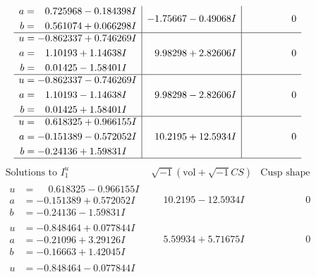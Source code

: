 \documentclass[1p]{elsarticle_modified}
\theoremstyle{definition}
\newcommand{\I}{\sqrt{-1}}
\begin{document}
$$\begin{array}{c|c|c}
\begin{aligned}
a &= \phantom{-}0.725968 - 0.184398 I \\
b &= \phantom{-}0.561074 + 0.066298 I\end{aligned}
 & -1.75667 - 0.49068 I & \phantom{-0.000000 } 0 \\ \hline\begin{aligned}
u &= -0.862337 + 0.746269 I \\
a &= \phantom{-}1.10193 + 1.14638 I \\
b &= \phantom{-}0.01425 - 1.58401 I\end{aligned}
 & \phantom{-}9.98298 + 2.82606 I & \phantom{-0.000000 } 0 \\ \hline\begin{aligned}
u &= -0.862337 - 0.746269 I \\
a &= \phantom{-}1.10193 - 1.14638 I \\
b &= \phantom{-}0.01425 + 1.58401 I\end{aligned}
 & \phantom{-}9.98298 - 2.82606 I & \phantom{-0.000000 } 0 \\ \hline\begin{aligned}
u &= \phantom{-}0.618325 + 0.966155 I \\
a &= -0.151389 - 0.572052 I \\
b &= -0.24136 + 1.59831 I\end{aligned}
 & \phantom{-}10.2195 + 12.5934 I & \phantom{-0.000000 } 0\\
 \hline 
 \end{array}$$\newpage$$\begin{array}{c|c|c}  
\text{Solutions to }I^u_{1}& \I (\text{vol} + \sqrt{-1}CS) & \text{Cusp shape}\\
 \hline 
\begin{aligned}
u &= \phantom{-}0.618325 - 0.966155 I \\
a &= -0.151389 + 0.572052 I \\
b &= -0.24136 - 1.59831 I\end{aligned}
 & \phantom{-}10.2195 - 12.5934 I & \phantom{-0.000000 } 0 \\ \hline\begin{aligned}
u &= -0.848464 + 0.077844 I \\
a &= -0.21096 + 3.29126 I \\
b &= -0.16663 + 1.42045 I\end{aligned}
 & \phantom{-}5.59934 + 5.71675 I & \phantom{-0.000000 } 0 \\ \hline\begin{aligned}
u &= -0.848464 - 0.077844 I \\

\end{aligned}
\end{array}$$
\end{document}
